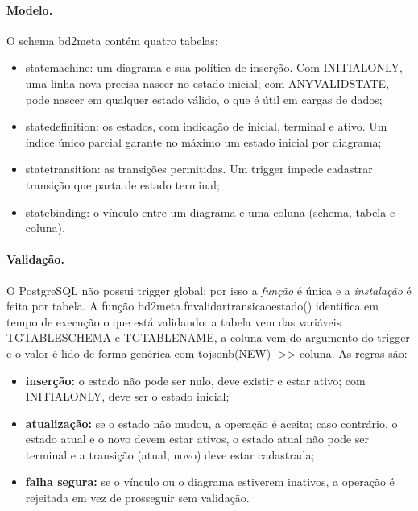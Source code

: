 \documentclass[11pt,a4paper]{article}
\newcommand{\cod}[1]{{\ttfamily\renewcommand{\_}{\textunderscore\allowbreak}#1}}
\begin{document}
\paragraph{Modelo.} O schema \cod{bd2\_meta} contém quatro tabelas:
\begin{itemize}
  \item \cod{state\_machine}: um diagrama e sua política de inserção. Com \cod{INITIAL\_ONLY}, uma linha nova
        precisa nascer no estado inicial; com \cod{ANY\_VALID\_STATE}, pode nascer em qualquer estado válido,
        o que é útil em cargas de dados;
  \item \cod{state\_definition}: os estados, com indicação de inicial, terminal e ativo. Um índice único parcial
        garante no máximo um estado inicial por diagrama;
  \item \cod{state\_transition}: as transições permitidas. Um trigger impede cadastrar transição que parta de
        estado terminal;
  \item \cod{state\_binding}: o vínculo entre um diagrama e uma coluna (schema, tabela e coluna).
\end{itemize}

\paragraph{Validação.} O PostgreSQL não possui trigger global; por isso a \emph{função} é única e a
\emph{instalação} é feita por tabela. A função \cod{bd2\_meta.fn\_validar\_transicao\_estado()} identifica em
tempo de execução o que está validando: a tabela vem das variáveis \cod{TG\_TABLE\_SCHEMA} e \cod{TG\_TABLE\_NAME},
a coluna vem do argumento do trigger e o valor é lido de forma genérica com \cod{to\_jsonb(NEW) -{}>{}> coluna}.
As regras são:
\begin{itemize}
  \item \textbf{inserção:} o estado não pode ser nulo, deve existir e estar ativo; com \cod{INITIAL\_ONLY}, deve
        ser o estado inicial;
  \item \textbf{atualização:} se o estado não mudou, a operação é aceita; caso contrário, o estado atual e o novo
        devem estar ativos, o estado atual não pode ser terminal e a transição (atual, novo) deve estar cadastrada;
  \item \textbf{falha segura:} se o vínculo ou o diagrama estiverem inativos, a operação é rejeitada em vez de
        prosseguir sem validação.
\end{itemize}
\end{document}
